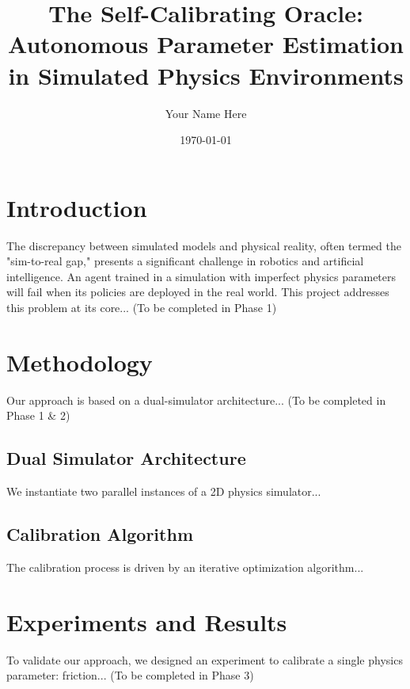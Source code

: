 \documentclass[11pt]{article}
\title{The Self-Calibrating Oracle: Autonomous Parameter Estimation in Simulated Physics Environments}
\author{Your Name Here}
\affil{Your Institution or Independent Researcher}
\date{\today}
\begin{document}
\maketitle

\begin{abstract}
\end{abstract}

\section{Introduction}
The discrepancy between simulated models and physical reality, often termed the "sim-to-real gap," presents a significant challenge in robotics and artificial intelligence. An agent trained in a simulation with imperfect physics parameters will fail when its policies are deployed in the real world. This project addresses this problem at its core... (To be completed in Phase 1)

\section{Methodology}
Our approach is based on a dual-simulator architecture... (To be completed in Phase 1 & 2)

\subsection{Dual Simulator Architecture}
We instantiate two parallel instances of a 2D physics simulator...

\subsection{Calibration Algorithm}
The calibration process is driven by an iterative optimization algorithm...

\section{Experiments and Results}
To validate our approach, we designed an experiment to calibrate a single physics parameter: friction... (To be completed in Phase 3)
\end{document}
